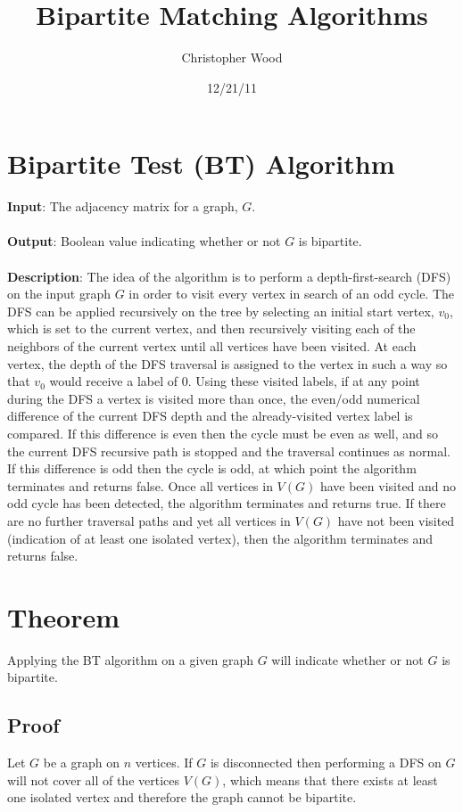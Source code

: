 \documentclass[a4paper,10pt]{article}
\title{Bipartite Matching Algorithms}
\author{Christopher Wood}
\date{12/21/11}
\begin{document}
\maketitle

\section{Bipartite Test (BT) Algorithm}
{\bf Input}: The adjacency matrix for a graph, $G$. \\ \\
{\bf Output}: Boolean value indicating whether or not $G$ is bipartite. \\ \\
{\bf Description}: The idea of the algorithm is to perform a depth-first-search (DFS) on the input graph $G$ in order to visit every vertex in search of an odd cycle. The DFS can be applied recursively on the tree by selecting an initial start vertex, $v_{0}$, which is set to the current vertex, and then recursively visiting each of the neighbors of the current vertex until all vertices have been visited. At each vertex, the depth of the DFS traversal is assigned to the vertex in such a way so that $v_{0}$ would receive a label of $0$. Using these visited labels, if at any point during the DFS a vertex is visited more than once, the even/odd numerical difference of the current DFS depth and the already-visited vertex label is compared. If this difference is even then the cycle must be even as well, and so the current DFS recursive path is stopped and the traversal continues as normal. If this difference is odd then the cycle is odd, at which point the algorithm terminates and returns false. Once all vertices in $V(G)$ have been visited and no odd cycle has been detected, the algorithm terminates and returns true. If there are no further traversal paths and yet all vertices in $V(G)$ have not been visited (indication of at least one isolated vertex), then the algorithm terminates and returns false.

\section{Theorem}
Applying the BT algorithm on a given graph $G$ will indicate whether or not $G$ is bipartite.

\subsection{Proof}
Let $G$ be a graph on $n$ vertices. If $G$ is disconnected then performing a DFS on $G$ will not cover all of the vertices $V(G)$, which means that there exists at least one isolated vertex and therefore the graph cannot be bipartite. 
\end{document}
